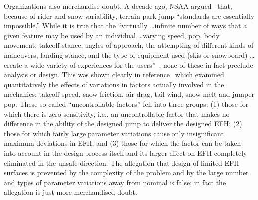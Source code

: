 \documentclass[smallextended]{svjour3}       %
\begin{document}
Organizations also merchandise doubt. A decade ago, NSAA argued~\cite{NSAA2015}
that, because of rider and snow variability, terrain park jump ``standards are
essentially impossible.'' While it is true that the ``virtually \ldots infinite number of
ways that a given feature may be used by an individual \ldots varying speed,
pop, body movement, takeoff stance, angles of approach, the attempting of
different kinds of maneuvers, landing stance, and the type of equipment used
(skis or snowboard) \ldots create a wide variety of experiences for the
users''~\cite{NSAA2015}, none of these in fact preclude analysis or design.
This was shown clearly in reference~\cite{Hubbard2012} which examined
quantitatively the effects of variations in factors actually involved in the
mechanics: takeoff speed, snow friction, air drag, tail wind, snow melt and
jumper pop. These so-called ``uncontrollable factors'' fell into three groups:
(1) those for which there is zero sensitivity, i.e., an uncontrollable factor
that makes no difference in the ability of the designed jump to deliver the
designed EFH; (2) those for which fairly large parameter variations cause only
insignificant maximum deviations in EFH, and (3) those for which the factor can
be taken into account in the design process itself and its larger effect on EFH
completely eliminated in the unsafe direction. The allegation that design of
limited EFH surfaces is prevented by the complexity of the problem and by the
large number and types of parameter variations away from nominal is false; in
fact the allegation is just more merchandised doubt.

\end{document}
